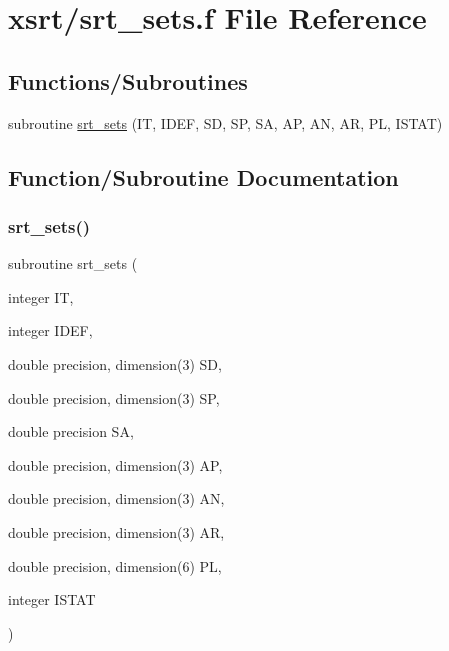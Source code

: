 \hypertarget{srt__sets_8f}{}\section{xsrt/srt\+\_\+sets.f File Reference}
\label{srt__sets_8f}
\subsection*{Functions/\+Subroutines}
\begin{DoxyCompactItemize}
\item 
subroutine \hyperlink{srt__sets_8f_a8944ba60e4fb1140b83469ceacbb1c92}{srt\+\_\+sets} (IT, I\+D\+EF, SD, SP, SA, AP, AN, AR, PL, I\+S\+T\+AT)
\end{DoxyCompactItemize}


\subsection{Function/\+Subroutine Documentation}
\mbox{\label{srt__sets_8f_a8944ba60e4fb1140b83469ceacbb1c92}} 
\subsubsection{\texorpdfstring{srt\+\_\+sets()}{srt\_sets()}}
{\footnotesize\ttfamily subroutine srt\+\_\+sets (\begin{DoxyParamCaption}\item[{integer}]{IT,  }\item[{integer}]{I\+D\+EF,  }\item[{double precision, dimension(3)}]{SD,  }\item[{double precision, dimension(3)}]{SP,  }\item[{double precision}]{SA,  }\item[{double precision, dimension(3)}]{AP,  }\item[{double precision, dimension(3)}]{AN,  }\item[{double precision, dimension(3)}]{AR,  }\item[{double precision, dimension(6)}]{PL,  }\item[{integer}]{I\+S\+T\+AT }\end{DoxyParamCaption})}

